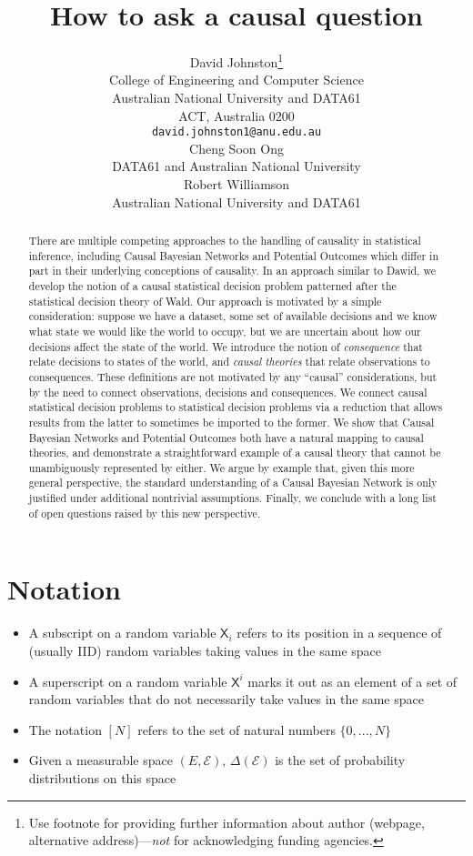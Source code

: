 \documentclass{article}
\title{How to ask a causal question}
\author{%
  David Johnston\thanks{Use footnote for providing further information
    about author (webpage, alternative address)---\emph{not} for acknowledging
    funding agencies.} \\
  College of Engineering and Computer Science\\
  Australian National University and DATA61\\
  ACT, Australia 0200 \\
  \texttt{david.johnston1@anu.edu.au} \\
   \And
  Cheng Soon Ong\\
  DATA61 and Australian National University\\
   \And
   Robert Williamson \\
   Australian National University and DATA61\\
}
\theoremstyle{plain}
\theoremstyle{definition}
\newcommand{\RV}[1]{\ensuremath{\mathsf{#1}}}
\begin{document}
\maketitle

\begin{abstract}
There are multiple competing approaches to the handling of causality in statistical inference, including Causal Bayesian Networks and Potential Outcomes which differ in part in their underlying conceptions of causality. In an approach similar to Dawid, we develop the notion of a causal statistical decision problem patterned after the statistical decision theory of Wald. Our approach is motivated by a simple consideration: suppose we have a dataset, some set of available decisions and we know what state we would like the world to occupy, but we are uncertain about how our decisions affect the state of the world. We introduce the notion of \emph{consequence } that relate decisions to states of the world, and \emph{causal theories} that relate observations to consequences. These definitions are not motivated by any ``causal'' considerations, but by the need to connect observations, decisions and consequences. We connect causal statistical decision problems to statistical decision problems via a reduction that allows results from the latter to sometimes be imported to the former. We show that Causal Bayesian Networks and Potential Outcomes both have a natural mapping to causal theories, and demonstrate a straightforward example of a causal theory that cannot be unambiguously represented by either. We argue by example that, given this more general perspective, the standard understanding of a Causal Bayesian Network is only justified under additional nontrivial assumptions. Finally, we conclude with a long list of open questions raised by this new perspective.
\end{abstract}

\section{Notation}

\begin{itemize}
    \item A subscript on a random variable $\RV{X}_i$ refers to its position in a sequence of (usually IID) random variables taking values in the same space
    \item A superscript on a random variable $\RV{X}^i$ marks it out as an element of a set of random variables that do not necessarily take values in the same space
    \item The notation $[N]$ refers to the set of natural numbers $\{0,...,N\}$
    \item Given a measurable space $(E,\mathcal{E})$, $\Delta(\mathcal{E})$ is the set of probability distributions on this space
\end{itemize}
\end{document}

